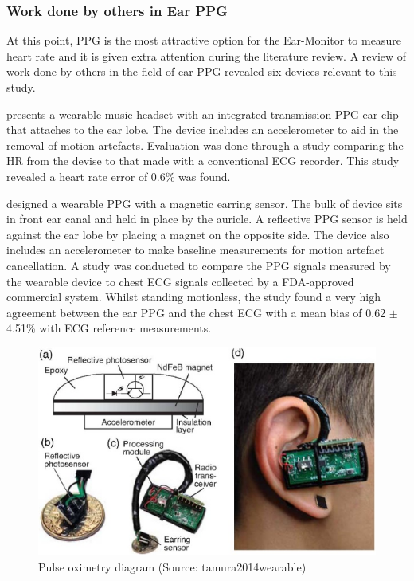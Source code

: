 \subsubsection{Work done by others in Ear PPG}
At this point, PPG is the most attractive option for the Ear-Monitor to measure heart rate and it is given extra attention during the literature review.  A review of work done by others in the field of ear PPG revealed six devices relevant to this study.

\medskip
\cite{shin2009novel} presents a wearable music headset with an integrated transmission PPG ear clip that attaches to the ear lobe. The device includes an accelerometer to aid in the removal of motion artefacts. Evaluation was done through a study comparing the HR from the devise to that made with a conventional ECG recorder. This study revealed a heart rate error of 0.6\% was found.

\medskip
\cite{poh2010motion} designed a wearable PPG with a magnetic earring sensor. The bulk of device sits in front ear canal and held in place by the auricle. A reflective PPG sensor is held against the ear lobe by placing a magnet on the opposite side. The device also includes an accelerometer to make baseline measurements for motion artefact cancellation. A study was conducted to compare the PPG signals measured by the wearable device to chest ECG signals collected by a FDA-approved commercial system. Whilst standing motionless, the study found a very high agreement between the ear PPG and the chest ECG with a mean bias of 0.62 $\pm$ 4.51\% with ECG reference measurements.

\medskip

\begin{figure}[h]
   \centering
   \includegraphics[scale=1.2]{figs/poh}
   \caption{Pulse oximetry diagram (Source: tamura2014wearable)}
   \label{fig:poh}
\end{figure}

